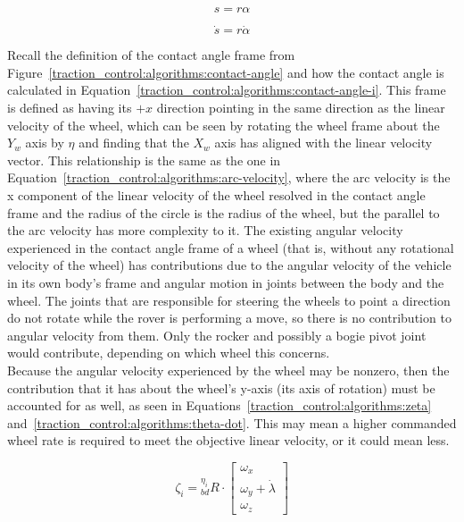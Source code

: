 \begin{equation}\label{traction_control:algorithms:arc-length}
	s = r \alpha
\end{equation}

\begin{equation}\label{traction_control:algorithms:arc-velocity}
	\dot{s} = r \dot{\alpha}
\end{equation}

Recall the definition of the contact angle frame from Figure~\ref{traction_control:algorithms:contact-angle} and how the contact angle is calculated in Equation~\ref{traction_control:algorithms:contact-angle-i}. This frame is defined as having its $+x$ direction pointing in the same direction as the linear velocity of the wheel, which can be seen by rotating the wheel frame about the $Y_{w}$ axis by $\eta$ and finding that the $X_{w}$ axis has aligned with the linear velocity vector. This relationship is the same as the one in Equation~\ref{traction_control:algorithms:arc-velocity}, where the arc velocity is the x component of the linear velocity of the wheel resolved in the contact angle frame and the radius of the circle is the radius of the wheel, but the parallel to the arc velocity has more complexity to it. The existing angular velocity experienced in the contact angle frame of a wheel (that is, without any rotational velocity of the wheel) has contributions due to the angular velocity of the vehicle in its own body's frame and angular motion in joints between the body and the wheel. The joints that are responsible for steering the wheels to point a direction do not rotate while the rover is performing a move, so there is no contribution to angular velocity from them. Only the rocker and possibly a bogie pivot joint would contribute, depending on which wheel this concerns. \\

Because the angular velocity experienced by the wheel may be nonzero, then the contribution that it has about the wheel's y-axis (its axis of rotation) must be accounted for as well, as seen in Equations~\ref{traction_control:algorithms:zeta} and~\ref{traction_control:algorithms:theta-dot}. This may mean a higher commanded wheel rate is required to meet the objective linear velocity, or it could mean less.

\begin{equation}\label{traction_control:algorithms:zeta}
	\zeta_{i} = {}^{\eta_{i}}_{bd}R \cdot \left[\begin{array}{c}
		\omega_{x} \\
		\omega_{y} + \dot{\lambda} \\
		\omega_{z}
	\end{array}\right]
\end{equation}

